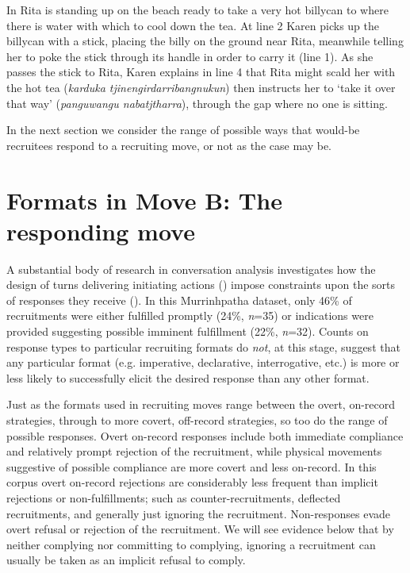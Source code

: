 \documentclass[output=paper,nonflat,colorlinks,citecolor=brown]{langsci/langscibook}
\begin{document}
In  Rita is standing up on the beach ready to take a very hot billycan to where there is water with which to cool down the tea. At line 2 Karen picks up the billycan with a stick, placing the billy on the ground near Rita, meanwhile telling her to poke the stick through its handle in order to carry it (line 1).  As she passes the stick to Rita, Karen explains in line 4 that Rita might scald her with the hot tea (\textit{karduka tjinengirdarribangnukun}) then instructs her to ‘take it over that way’ (\textit{panguwangu nabatjtharra}), through the gap where no one is sitting.

In the next section we consider the range of possible ways that would-be recruitees respond to a recruiting move, or not as the case may be.

\section{Formats in Move B: The responding move}\label{sec:blythe:4}

A substantial body of research in conversation analysis investigates how the design of turns delivering initiating actions (\citealt{Wootton1997,VinkhuyzenSzymanski2005,Curl2006,curl_contingency_2008,CravenPotter2010,EnfieldEtAl2010,StiversRossano2010,DeRuiter2012,Rossi2012,KendrickDrew2016}) impose constraints upon the sorts of responses they receive (\citealt{Raymond2003,SchegloffLerner2009,FoxThompson2010,Lee2013,ThompsonFoxCouperKuhlen2015}). In this Murrinhpatha dataset, only 46\% of recruitments were either fulfilled promptly (24\%, \textit{n}=35) or indications were provided suggesting possible imminent fulfillment (22\%, \textit{n}=32). Counts on response types to particular recruiting formats do \textit{not}, at this stage, suggest that any particular format (e.g. imperative, declarative, interrogative, etc.) is more or less likely to successfully elicit the desired response than any other format.

Just as the formats used in recruiting moves range between the overt, on-record strategies, through to more covert, off-record strategies, so too do the range of possible responses. Overt on-record responses include both immediate compliance and relatively prompt rejection of the recruitment, while physical movements suggestive of possible compliance are more covert and less on-record. In this corpus overt on-record rejections are considerably less frequent than implicit rejections or non-fulfillments; such as counter-recruitments, deflected recruitments, and generally just ignoring the recruitment. Non-responses evade overt refusal or rejection of the recruitment. We will see evidence below that by neither complying nor committing to complying, ignoring a recruitment can usually be taken as an implicit refusal to comply.
\end{document}
